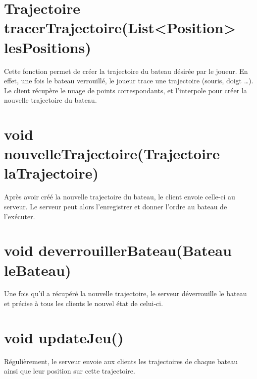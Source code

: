 \section{Trajectoire tracerTrajectoire(List<Position> lesPositions)}

Cette fonction permet de créer la trajectoire du bateau désirée par le joueur. En effet, une fois le bateau verrouillé, le joueur trace une trajectoire (souris, doigt \dots{}). Le client récupère le nuage de points correspondants, et l'interpole pour créer la nouvelle trajectoire du bateau. 

\section{void nouvelleTrajectoire(Trajectoire laTrajectoire)}

Après avoir créé la nouvelle trajectoire du bateau, le client envoie celle-ci au serveur. Le serveur peut alors l'enregistrer et donner l'ordre au bateau de l'exécuter.

\section{void deverrouillerBateau(Bateau leBateau)}

Une fois qu'il a récupéré la nouvelle trajectoire, le serveur déverrouille le bateau et précise à tous les clients le nouvel état de celui-ci.

\section{void updateJeu()}

Régulièrement, le serveur envoie aux clients les trajectoires de chaque bateau ainsi que leur position sur cette trajectoire.



